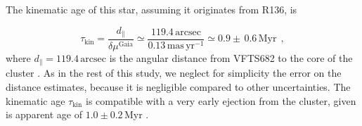 \documentclass[apjl,twocolumn]{emulateapj}
\newcommand{\masyr}{\,\mathrm{mas}\,\mathrm{yr}^{-1}}
\begin{document}

The kinematic age of this star, assuming it originates from R136, is

\begin{equation}
  \label{eq:kin_age}
  \tau_\mathrm{kin} = \frac{d_\parallel}{\delta\mu^\mathrm{Gaia}} \simeq
  \frac{119.4\,\mathrm{arcsec}}{0.13\masyr} \simeq 0.9\pm\,0.6\, \mathrm{Myr} \ \ ,
\end{equation}
where $d_\parallel = 119.4\,\mathrm{arcsec}$ is the angular distance from VFTS682 to
the core of the cluster \citep[corresponding to $\sim$29\,pc at LMC distance,][]{bestenlehner:11}.
As in the rest of this study, we neglect for
simplicity the error on the distance estimates, because it is negligible compared to other uncertainties.
The kinematic age $\tau_\mathrm{kin}$ is compatible with a very early
ejection from the cluster, given is apparent age
of $1.0\pm 0.2$\,Myr \citep{schneider:18}. %


\end{document}

